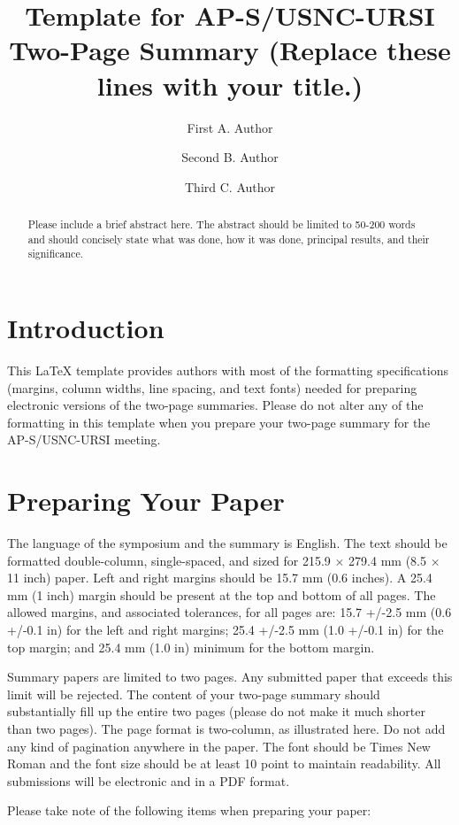 \documentclass[]{NRSMRev}
\title{Template for AP-S/USNC-URSI Two-Page Summary (Replace these lines with your title.)}
\author[org1]{First A. Author}
\author[org1]{Second B. Author}
\author[org2]{Third C. Author}
\begin{document}
\maketitle

\begin{abstract}
  Please include a brief abstract here. The abstract should be limited to 50-200 words and should concisely state what was done, how it was done, principal results, and their significance.
\end{abstract}



\section{Introduction}
This LaTeX template provides authors with most of the formatting specifications (margins, column widths, line spacing, and text fonts) needed for preparing electronic versions of the two-page summaries. Please do not alter any of the formatting in this template when you prepare your two-page summary for the AP-S/USNC-URSI meeting.

\section{Preparing Your Paper}

The language of the symposium and the summary is English. The text should be formatted double-column, single-spaced, and sized for 215.9 $\times$ 279.4 mm (8.5 $\times$ 11 inch) paper. Left and right margins should be 15.7 mm (0.6 inches). A 25.4 mm (1 inch) margin should be present at the top and bottom of all pages. The allowed margins, and associated tolerances, for all pages are: 15.7 +/-2.5 mm (0.6 +/-0.1 in) for the left and right margins; 25.4 +/-2.5 mm (1.0 +/-0.1 in) for the top margin; and 25.4 mm (1.0 in) minimum for the bottom margin.

Summary papers are limited to two pages. Any submitted paper that exceeds this limit will be rejected.  The content of your two-page summary should substantially fill up the entire two pages (please do not make it much shorter than two pages). The page format is two-column, as illustrated here.  Do not add any kind of pagination anywhere in the paper. The font should be Times New Roman and the font size should be at least 10 point to maintain readability. All submissions will be electronic and in a PDF format.

Please take note of the following items when preparing your paper:
\end{document}
